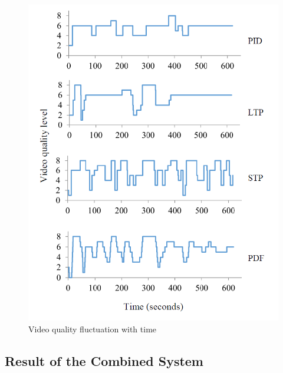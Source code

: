 \documentclass[journal]{IEEEtran}
\begin{document}
\begin{figure}
\centering
\includegraphics[width = 0.9\linewidth]{Fluctuation.png}
\caption{Video quality fluctuation with time \label{fig:fluctuation}}
\end{figure}

\subsection{Result of the Combined System}
\end{document}

